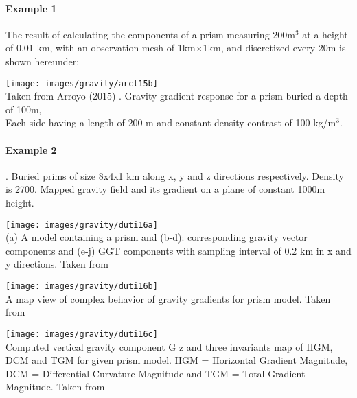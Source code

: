 \newpage
\paragraph{Example 1}
The result of calculating
the components of a prism measuring 200m$^3$ at a height of 0.01 km, 
with an observation mesh of 1km$\times$1km, and discretized every 20m is shown hereunder:
\begin{center}
\texttt{[image: images/gravity/arct15b]}\\
{\captionfont Taken from Arroyo \etal (2015) \cite{arct15}. 
Gravity gradient response for a prism buried a depth of 100m,\\ 
Each side having a length of 200 m and constant density contrast 
of 100 kg/m$^3$.}
\end{center}


\newpage
\paragraph{Example 2}. Buried prims of size 8x4x1 km along x, y and z directions respectively. 
Density is 2700. Mapped gravity field and its gradient on a plane of constant 1000m height.

\begin{center}
\texttt{[image: images/gravity/duti16a]}\\
{\captionfont (a) A model containing a prism and (b-d): corresponding gravity vector components and 
(e-j) GGT components with sampling interval of 0.2 km in x and y directions. Taken from \cite{duti16}}
\end{center}

\begin{center}
\texttt{[image: images/gravity/duti16b]}\\
{\captionfont A map view of complex behavior of gravity gradients for prism model. Taken from \cite{duti16}}
\end{center}

\begin{center}
\texttt{[image: images/gravity/duti16c]}\\
{\captionfont Computed vertical gravity component G z and three invariants map of HGM, DCM and TGM 
for given prism model. HGM = Horizontal Gradient Magnitude,
DCM = Differential Curvature Magnitude and TGM = Total Gradient Magnitude. Taken from \cite{duti16}}
\end{center}







